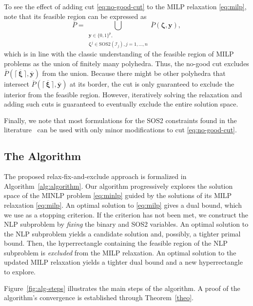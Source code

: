 \documentclass[pdflatex,sn-mathphys-num]{sn-jnl}%
\newcommand{\new}[1]{#1}
\begin{document}
\new{%
To see the effect of adding cut \eqref{eq:no-good-cut} to the MILP relaxation \ref{eq:milp}, note that its feasible region can be expressed as
\begin{equation}\label{eq:union-subproblems}
    \overline{P} = \bigcup_{\substack{\bm{y}\in\{0,1\}^p,\\ \bm{\zeta}^j\in \text{SOS2}(\mathcal{I}_j), j=1,\ldots,n}} \overline{P}(\bm{\zeta},\bm{y})
,\end{equation}
which is in line with the classic understanding of the feasible region of MILP problems as the union of finitely many polyhedra.
Thus, the no-good cut excludes $\overline{P}(\lceil\,\overline{\bm{\xi}} \,\rceil,\overline{\bm{y}})$ from the union.
Because there might be other polyhedra that intersect $\overline{P}(\lceil\,\overline{\bm{\xi}} \,\rceil,\overline{\bm{y}})$ at its border, the cut is only guaranteed to exclude the interior from the feasible region.
However, iteratively solving the relaxation and adding such cuts is guaranteed to eventually exclude the entire solution space.
}

\new{%
Finally, we note that most formulations for the SOS2 constraints found in the literature~\citep{vielma2010modeling,Silva:EJOR:2014} can be used with only minor modifications to cut \eqref{eq:no-good-cut}.
}


\subsection{The Algorithm}

The proposed relax-fix-and-exclude approach is formalized in Algorithm~\ref{alg:algorithm}.
Our algorithm progressively explores the solution space of the MINLP problem \ref{eq:minlp} guided by the solutions of its MILP relaxation \ref{eq:milp}.
\new{%
An optimal solution to \ref{eq:milp} gives a dual bound, which we use as a stopping criterion.
If the criterion has not been met, we construct the NLP subproblem by \emph{fixing} the binary and SOS2 variables.
An optimal solution to the NLP subproblem yields a candidate solution and, possibly, a tighter primal bound.
Then, the hyperrectangle containing the feasible region of the NLP subproblem is \emph{excluded} from the MILP relaxation.
An optimal solution to the updated MILP relaxation yields a tighter dual bound and a new hyperrectangle to explore.
}
Figure~\ref{fig:alg-steps} illustrates the main steps of the algorithm.
A proof of the algorithm's convergence is established through Theorem~\ref{theo}.
\end{document}
